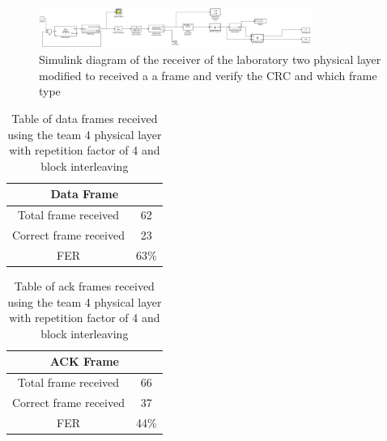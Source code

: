 \begin{figure}[ht]
    \centering
    \includegraphics[width=0.8\textwidth]{receiver_team4.PNG}
    \caption{Simulink diagram of the receiver of the laboratory two physical layer modified to received a a frame and verify the CRC and which frame type }
    \label{fig:receiver_team4}
\end{figure}

\begin{table}[ht]
	\centering
		\begin{tabular}{| c | c | }
		\hline
			\multicolumn{2}{|c|}{Data Frame}\\
		\hline                       
			 Total frame received & 62\\
			 Correct frame received& 23\\
		\hline
			FER & 63\%\\
		\hline
		\end{tabular}
	\caption{Table of data frames received using the team 4 physical layer with repetition factor of 4 and block interleaving}
	\label{tab:team4data}
	\end{table}

\begin{table}[ht]
	\centering
		\begin{tabular}{| c | c | }
		\hline
			\multicolumn{2}{|c|}{ACK Frame}\\ 
		\hline                       
			 Total frame received & 66\\
			 Correct frame received& 37\\
		\hline
			FER & 44\%\\
		\hline
		\end{tabular}
	\caption{Table of ack frames received using the team 4 physical layer with repetition factor of 4 and block interleaving}
	\label{tab:team4ack}
	\end{table}
